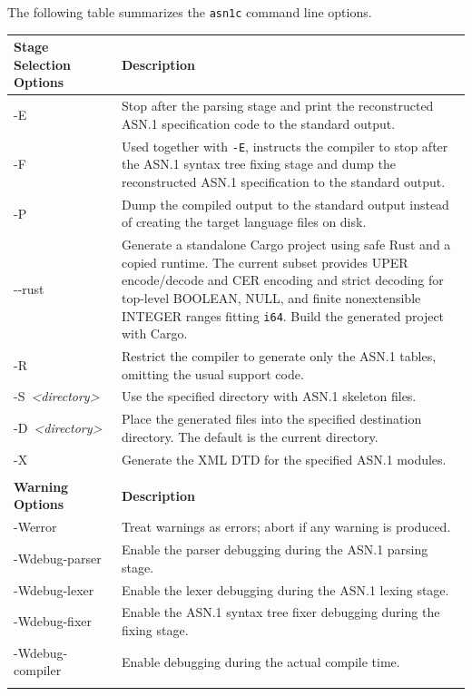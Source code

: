\documentclass[english,oneside,12pt]{book}
\newcommand{\cmd}[1]{\texttt{#1}}
\begin{document}
The following table summarizes the \cmd{asn1c} command line options.

\renewcommand{\arraystretch}{1.33}
\begin{longtable}{lp{4in}}
\textbf{Stage Selection Options} & \textbf{Description}\\
\midrule
{\ttfamily -E} & {\small Stop after the parsing stage and print the reconstructed ASN.1
specification code to the standard output.}\\
{\ttfamily -F} & {\small Used together with \texttt{-E}, instructs the compiler to stop after
the ASN.1 syntax tree fixing stage and dump the reconstructed ASN.1
specification to the standard output.}\\
{\ttfamily -P} & {\small Dump the compiled output to the standard output instead of
creating the target language files on disk.}\\
{\ttfamily -{}-rust} & {\small Generate a standalone Cargo project using safe Rust and a copied
runtime. The current subset provides UPER encode/decode and CER encoding and strict decoding for
top-level BOOLEAN, NULL, and finite nonextensible INTEGER ranges fitting \texttt{i64}. Build the
generated project with Cargo.}\\
{\ttfamily -R} & {\small Restrict the compiler to generate only the ASN.1 tables, omitting the usual support code.}\\
{\ttfamily -S~\emph{<directory>}} & {\small Use the specified directory with ASN.1 skeleton files.}\\
{\ttfamily -D~\emph{<directory>}} & {\small Place the generated files into the specified destination directory. The default is the current directory.}\\
{\ttfamily -X} & {\small Generate the XML DTD for the specified ASN.1 modules.}\\\\
\textbf{Warning Options} & \textbf{Description}\\
\midrule
{\ttfamily -Werror} & {\small Treat warnings as errors; abort if any warning is produced.}\\
{\ttfamily -Wdebug-parser} & {\small Enable the parser debugging during the ASN.1 parsing stage.}\\
{\ttfamily -Wdebug-lexer} & {\small Enable the lexer debugging during the ASN.1 lexing stage.}\\
{\ttfamily -Wdebug-fixer} & {\small Enable the ASN.1 syntax tree fixer debugging during the fixing stage.}\\
{\ttfamily -Wdebug-compiler} & {\small Enable debugging during the actual compile time.}\\  \\

\end{longtable}
\end{document}
